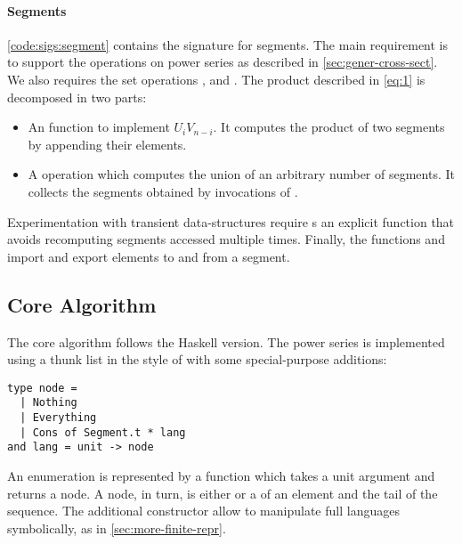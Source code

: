 \paragraph{Segments}

\autoref{code:sigs:segment} contains the signature for segments.
The main requirement is to support the operations on power series as described in \autoref{sec:gener-cross-sect}.
We also requires the set operations
,  and .
%
The product described in \autoref{eq:1} is decomposed in two parts:
\begin{itemize}[leftmargin=*]
\item An  function to implement $U_i V_{n-i}$. It computes the
  product of two segments by appending their elements.
\item A  operation which computes the union of an arbitrary number
  of segments. It collects the segments obtained
  by invocations of .
\end{itemize}
%
Experimentation with transient data-structures require s
an explicit  function that avoids recomputing segments accessed
multiple times. 
%
Finally, the functions   and  import and
export elements to and from a segment.

\subsection{Core Algorithm}

The core algorithm follows the Haskell version. The power series
is implemented using a thunk list in the style of \citet{DBLP:conf/cpp/Pottier17}
with some special-purpose additions:

\begin{lstlisting}
type node =
  | Nothing
  | Everything
  | Cons of Segment.t * lang
and lang = unit -> node
\end{lstlisting}

An enumeration is represented by a function which takes a unit argument and returns
a node. A node, in turn, is either  or a  of an
element and the tail of the sequence.
The additional constructor  allow to manipulate
full languages symbolically, as in \cref{sec:more-finite-repr}.

